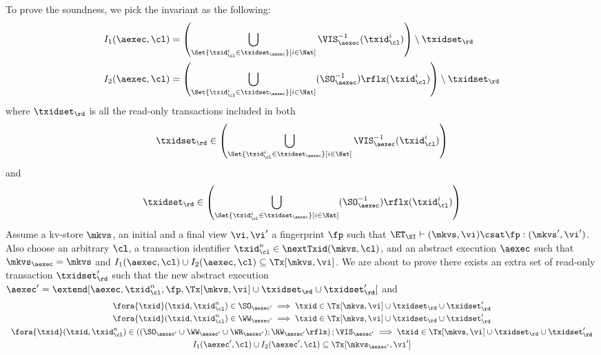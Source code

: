 To prove the soundness, we pick the invariant as the following:
\begin{align*}
    I_1(\aexec, \cl) & = \left( \bigcup_{\Set{\txid_{\cl}^{i} \in \txidset_{\aexec} }[ i \in \Nat ]} \VIS_{\aexec}^{-1}(\txid^i_\cl) \right) \setminus \txidset_\rd \\
    I_2(\aexec, \cl) & = \left( \bigcup_{\Set{\txid_{\cl}^{i} \in \txidset_{\aexec} }[ i \in \Nat ]} (\SO_{\aexec}^{-1})\rflx(\txid^i_\cl) \right) \setminus \txidset_\rd
\end{align*}
where \( \txidset_\rd \) is all the read-only transactions included in both 
\[ \txidset_\rd \in \left( \bigcup_{\Set{\txid_{\cl}^{i} \in \txidset_{\aexec} }[ i \in \Nat ]} \VIS_{\aexec}^{-1}(\txid^i_\cl) \right)\]
and \[ \txidset_\rd \in \left( \bigcup_{\Set{\txid_{\cl}^{i} \in \txidset_{\aexec} }[ i \in \Nat ]} (\SO_{\aexec}^{-1})\rflx(\txid^i_\cl) \right) \]
Assume a kv-store $\mkvs$, an initial and a final view $\vi, \vi'$  a fingerprint $\fp$ 
such that $\ET_{\SI} \vdash (\mkvs, \vi) \csat \fp: (\mkvs',\vi')$. 
Also choose an arbitrary $\cl$, a transaction identifier $\txid_\cl^n \in \nextTxid(\mkvs, \cl)$, 
and an abstract execution $\aexec$ such that $\mkvs_{\aexec} = \mkvs$ and 
\( I_1(\aexec, \cl) \cup I_2(\aexec, \cl) \subseteq \Tx[\mkvs, \vi] \).
We are about to prove there exists an extra set of read-only transaction \( \txidset'_\rd \) such that
the new abstract execution \( \aexec' = \extend[\aexec, \txid_\cl^n, \fp, \Tx[\mkvs, \vi] \cup \txidset_\rd \cup \txidset'_\rd]\) and 
\begin{gather}
    \fora{\txid} (\txid, \txid_\cl^n) \in \SO_{\aexec'} \implies \txid \in \Tx[\mkvs, \vi] \cup \txidset_\rd \cup \txidset'_\rd \label{equ:si-sound-update-so}\\
    \fora{\txid} (\txid, \txid_\cl^n) \in \WW_{\aexec'} \implies \txid \in \Tx[\mkvs, \vi] \cup \txidset_\rd \cup \txidset'_\rd \label{equ:si-sound-update-ww}\\
    \begin{array}{l}
    \fora{\txid} (\txid, \txid_\cl^n) \in \left( (\SO_{\aexec'} \cup \WW_{\aexec'} \cup \WR_{\aexec'} ) ; \RW_{\aexec'}\rflx \right) ; \VIS_{\aexec'} 
    \implies \txid \in \Tx[\mkvs, \vi] \cup \txidset_\rd \cup \txidset'_\rd 
    \end{array}
    \label{equ:si-sound-update-arvis}\\
    I_1(\aexec',\cl) \cup I_2(\aexec',\cl) \subseteq \Tx[\mkvs_{\aexec'}, \vi'] \label{equ:si-sound-inv} 
\end{gather}
